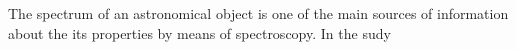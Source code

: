 The spectrum of an astronomical object is one of the main sources of information about the its properties by means of spectroscopy. In the sudy 
